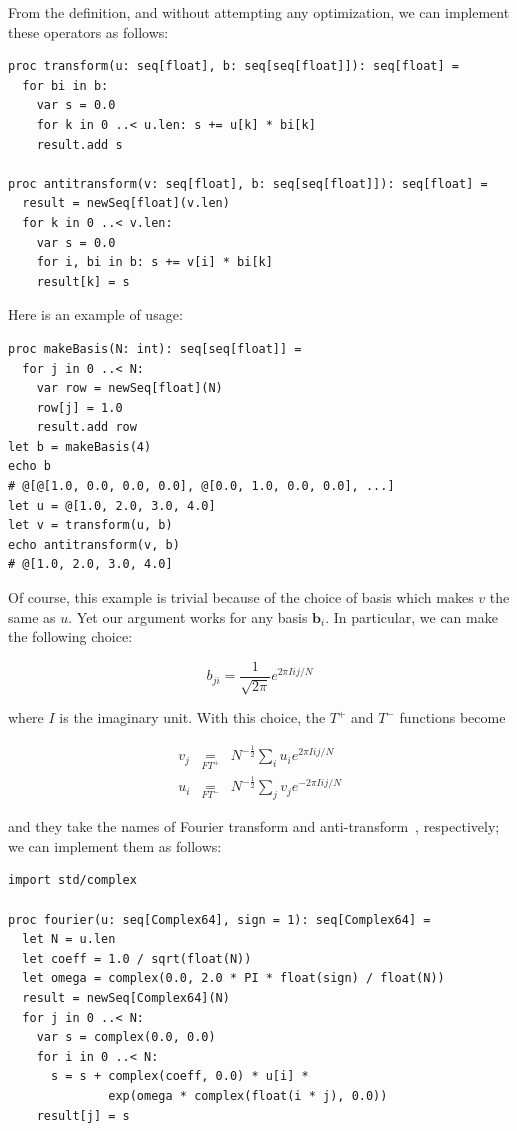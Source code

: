 \documentclass[justified, sixbynine]{tufte-book}
\def\stackunder#1#2{\mathrel{\mathop{#2}\limits_{#1}}}
\theoremstyle{plain}%
\newtheorem * {corollary}{Corollary}
\theoremstyle{definition}
\theoremstyle{remark}
\newtheorem * {remark}{Remark}
\newtheorem * {note}{Note}
\begin{document}
\begin{fullwidth}
From the definition, and without attempting any optimization, we can implement these operators as follows:

\begin{lstlisting}
proc transform(u: seq[float], b: seq[seq[float]]): seq[float] =
  for bi in b:
    var s = 0.0
    for k in 0 ..< u.len: s += u[k] * bi[k]
    result.add s

proc antitransform(v: seq[float], b: seq[seq[float]]): seq[float] =
  result = newSeq[float](v.len)
  for k in 0 ..< v.len:
    var s = 0.0
    for i, bi in b: s += v[i] * bi[k]
    result[k] = s
\end{lstlisting}

Here is an example of usage:

\begin{lstlisting}
proc makeBasis(N: int): seq[seq[float]] =
  for j in 0 ..< N:
    var row = newSeq[float](N)
    row[j] = 1.0
    result.add row
let b = makeBasis(4)
echo b
# @[@[1.0, 0.0, 0.0, 0.0], @[0.0, 1.0, 0.0, 0.0], ...]
let u = @[1.0, 2.0, 3.0, 4.0]
let v = transform(u, b)
echo antitransform(v, b)
# @[1.0, 2.0, 3.0, 4.0]
\end{lstlisting}

Of course, this example is trivial because of the choice of basis which makes $v$ the same as $u$. Yet our argument works for any basis $\mathbf{b}_i$. In particular, we can make the following choice:

\begin{equation}
b_{ji} = \frac{1}{\sqrt{2\pi}} e^{2\pi I ij/N}
\end{equation}

where $I$ is the imaginary unit. With this choice, the $T^+$ and $T^-$ functions become

\begin{eqnarray}
v_j &\stackunder{FT^+}{=}& N^{-\frac12} \sum_i u_i e^{2\pi I ij/N} \\
\label{fourierd1}
u_i &\stackunder{FT^-}{=}& N^{-\frac12} \sum_j v_j e^{-2\pi I ij/N}
\label{fourierd2}
\end{eqnarray}

and they take the names of Fourier transform and anti-transform~\cite{fourier}, respectively;
we can implement them as follows:

\begin{lstlisting}
import std/complex

proc fourier(u: seq[Complex64], sign = 1): seq[Complex64] =
  let N = u.len
  let coeff = 1.0 / sqrt(float(N))
  let omega = complex(0.0, 2.0 * PI * float(sign) / float(N))
  result = newSeq[Complex64](N)
  for j in 0 ..< N:
    var s = complex(0.0, 0.0)
    for i in 0 ..< N:
      s = s + complex(coeff, 0.0) * u[i] *
              exp(omega * complex(float(i * j), 0.0))
    result[j] = s


\end{lstlisting}
\end{fullwidth}
\end{document}
